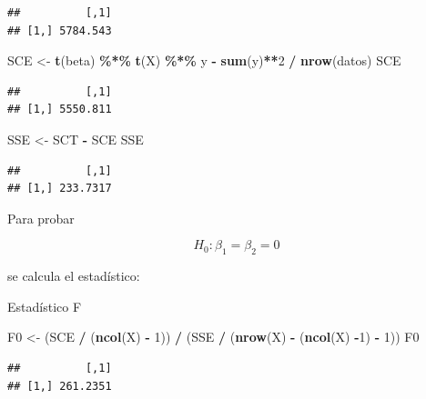 \documentclass[
]{book}
\newenvironment{Shaded}{\begin{snugshade}}{\end{snugshade}}
\newcommand{\DecValTok}[1]{\textcolor[rgb]{0.00,0.00,0.81}{#1}}
\newcommand{\FunctionTok}[1]{\textcolor[rgb]{0.13,0.29,0.53}{\textbf{#1}}}
\newcommand{\NormalTok}[1]{#1}
\newcommand{\OtherTok}[1]{\textcolor[rgb]{0.56,0.35,0.01}{#1}}
\newcommand{\SpecialCharTok}[1]{\textcolor[rgb]{0.81,0.36,0.00}{\textbf{#1}}}
\begin{document}
\begin{verbatim}
##          [,1]
## [1,] 5784.543
\end{verbatim}

\begin{Shaded}
\begin{Highlighting}[]
\NormalTok{SCE }\OtherTok{\textless{}{-}} \FunctionTok{t}\NormalTok{(beta) }\SpecialCharTok{\%*\%} \FunctionTok{t}\NormalTok{(X) }\SpecialCharTok{\%*\%}\NormalTok{ y }\SpecialCharTok{{-}} \FunctionTok{sum}\NormalTok{(y)}\SpecialCharTok{**}\DecValTok{2} \SpecialCharTok{/} \FunctionTok{nrow}\NormalTok{(datos)}
\NormalTok{SCE}
\end{Highlighting}
\end{Shaded}

\begin{verbatim}
##          [,1]
## [1,] 5550.811
\end{verbatim}

\begin{Shaded}
\begin{Highlighting}[]
\NormalTok{SSE }\OtherTok{\textless{}{-}}\NormalTok{ SCT }\SpecialCharTok{{-}}\NormalTok{ SCE}
\NormalTok{SSE}
\end{Highlighting}
\end{Shaded}

\begin{verbatim}
##          [,1]
## [1,] 233.7317
\end{verbatim}

Para probar

\[H_0 : \beta_1 = \beta_2=0\]

se calcula el estadístico:

Estadístico F

\begin{Shaded}
\begin{Highlighting}[]
\NormalTok{F0 }\OtherTok{\textless{}{-}}\NormalTok{ (SCE }\SpecialCharTok{/}\NormalTok{ (}\FunctionTok{ncol}\NormalTok{(X) }\SpecialCharTok{{-}} \DecValTok{1}\NormalTok{)) }\SpecialCharTok{/}\NormalTok{ (SSE }\SpecialCharTok{/}\NormalTok{ (}\FunctionTok{nrow}\NormalTok{(X) }\SpecialCharTok{{-}}\NormalTok{ (}\FunctionTok{ncol}\NormalTok{(X) }\SpecialCharTok{{-}}\DecValTok{1}\NormalTok{) }\SpecialCharTok{{-}} \DecValTok{1}\NormalTok{))}
\NormalTok{F0}
\end{Highlighting}
\end{Shaded}

\begin{verbatim}
##          [,1]
## [1,] 261.2351
\end{verbatim}
\end{document}
